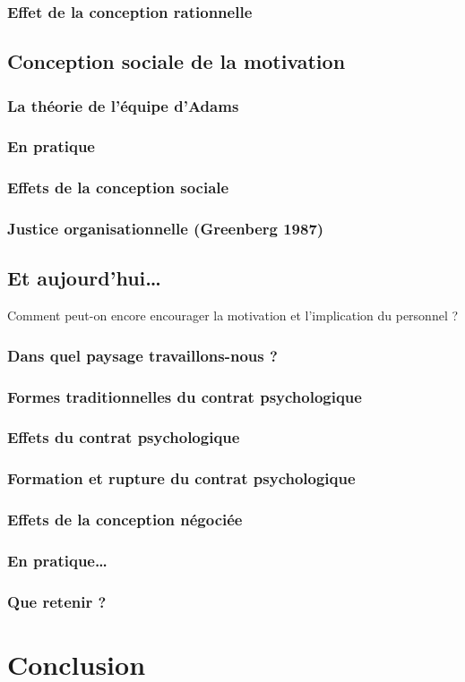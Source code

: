 \documentclass[12pt]{article}
\begin{document}
		\subsubsection{Effet de la conception rationnelle}
	\subsection{Conception sociale de la motivation}
		\subsubsection{La théorie de l’équipe d’Adams}
		\subsubsection{En pratique}
		\subsubsection{Effets de la conception sociale}
		\subsubsection{Justice organisationnelle (Greenberg 1987)}
	\subsection{Et aujourd’hui…}
		Comment peut-on encore encourager la motivation et l’implication du personnel ?
		\subsubsection{Dans quel paysage travaillons-nous ?}
		\subsubsection{Formes traditionnelles du contrat psychologique}
		\subsubsection{Effets du contrat psychologique}
		\subsubsection{Formation et rupture du contrat psychologique}
		\subsubsection{Effets de la conception négociée}
		\subsubsection{En pratique…}
		\subsubsection{Que retenir ?}

\section{Conclusion}



\end{document}
